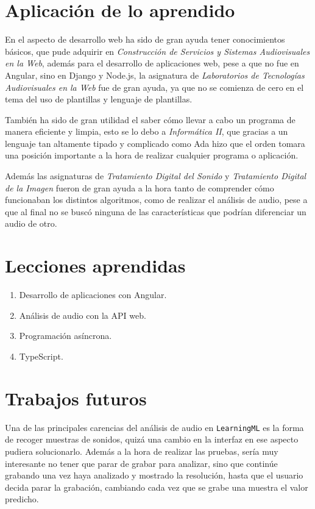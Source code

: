 \documentclass[a4paper, 12pt]{book}
\begin{document}
\section{Aplicación de lo aprendido}
\label{sec:aplicacion}

En el aspecto de desarrollo web ha sido de gran ayuda tener conocimientos básicos, que pude adquirir en \textit{Construcción de Servicios y Sistemas Audiovisuales en la Web}, además para el desarrollo de aplicaciones web, pese a que no fue en Angular, sino en Django y Node.js, la asignatura de \textit{Laboratorios de Tecnologías Audiovisuales en la Web} fue de gran ayuda, ya que no se comienza de cero en el tema del uso de plantillas y lenguaje de plantillas.

También ha sido de gran utilidad el saber cómo llevar a cabo un programa de manera eficiente y limpia, esto se lo debo a \textit{Informática II}, que gracias a un lenguaje tan altamente tipado y complicado como Ada hizo que el orden tomara una posición importante a la hora de realizar cualquier programa o aplicación.

Además las asignaturas de \textit{Tratamiento Digital del Sonido} y \textit{Tratamiento Digital de la Imagen} fueron de gran ayuda a la hora tanto de comprender cómo funcionaban los distintos algoritmos, como de realizar el análisis de audio, pese a que al final no se buscó ninguna de las características que podrían diferenciar un audio de otro.


\section{Lecciones aprendidas}
\label{sec:lecciones_aprendidas}

\begin{enumerate}
  \item Desarrollo de aplicaciones con Angular.
  \item Análisis de audio con la API web.
  \item Programación asíncrona.
  \item TypeScript.
\end{enumerate}


\section{Trabajos futuros}
\label{sec:trabajos_futuros}

Una de las principales carencias del análisis de audio en \texttt{LearningML} es la forma de recoger muestras de sonidos, quizá una cambio en la interfaz en ese aspecto pudiera solucionarlo. Además a la hora de realizar las pruebas, sería muy interesante no tener que parar de grabar para analizar, sino que continúe grabando una vez haya analizado y mostrado la resolución, hasta que el usuario decida parar la grabación, cambiando cada vez que se grabe una muestra el valor predicho.
\end{document}
